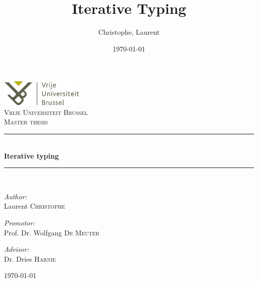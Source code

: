\documentclass[a4paper]{report}
\title{Iterative Typing}
\author{Christophe, Laurent}
\date{\today}
\newcommand{\HRule}{\rule{\linewidth}{0.5mm}}
\begin{document}
\begin{titlepage}

\begin{center}


\includegraphics[width=0.30\textwidth]{./vub.jpg}\\[1cm]    

\textsc{\LARGE Vrije Universiteit Brussel}\\[1.5cm]

\textsc{\Large Master thesis}\\[0.5cm]


\HRule \\[0.4cm]
{ \huge \bfseries Iterative typing}\\[0.4cm]

\HRule \\[1.5cm]

\begin{minipage}{0.4\textwidth}
\begin{flushleft} \large
\emph{Author:}\\
Laurent \textsc{Christophe}
\end{flushleft}
\end{minipage}
\begin{minipage}{0.4\textwidth}
\begin{flushright} \large
\emph{Promotor:} \\
Prof. Dr. Wolfgang \textsc{De Meuter}
\end{flushright}

\begin{flushright} \large
\emph{Advisor:} \\
Dr. Dries \textsc{Harnie}
\end{flushright}
\end{minipage}

\vfill

{\large \today}

\end{center}

\end{titlepage}
\end{document}
